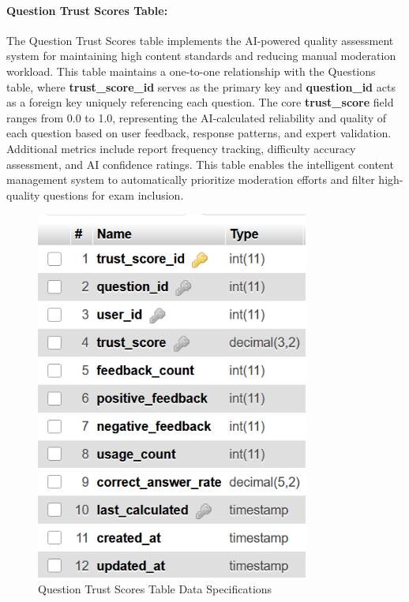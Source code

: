 \documentclass[12pt,a4paper,oneside]{book}
\begin{document}
\paragraph{Question Trust Scores Table:}
The Question Trust Scores table implements the AI-powered quality assessment system for maintaining high content standards and reducing manual moderation workload. This table maintains a one-to-one relationship with the Questions table, where \textbf{trust\_score\_id} serves as the primary key and \textbf{question\_id} acts as a foreign key uniquely referencing each question. The core \textbf{trust\_score} field ranges from 0.0 to 1.0, representing the AI-calculated reliability and quality of each question based on user feedback, response patterns, and expert validation. Additional metrics include report frequency tracking, difficulty accuracy assessment, and AI confidence ratings. This table enables the intelligent content management system to automatically prioritize moderation efforts and filter high-quality questions for exam inclusion.

\begin{figure}[H]
\centering
\includegraphics[width=0.8\textwidth]{assets/DBTable/Table4.6.png}
\caption{Question Trust Scores Table Data Specifications}
\label{table:question_trust_scores}
\end{figure}
\end{document}
